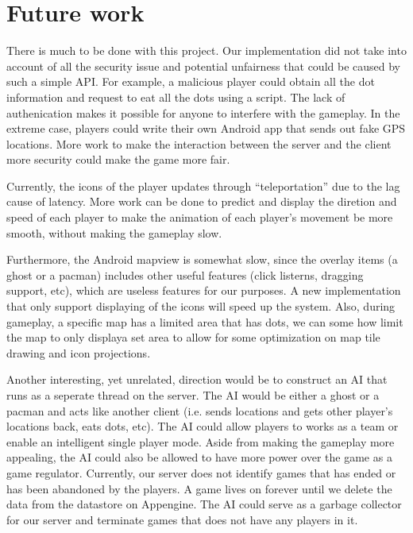 \documentclass{acm_proc_article-sp}
\begin{document}
\section{Future work}

There is much to be done with this project. Our implementation did not
take into account of all the security issue and potential unfairness
that could be caused by such a simple API. For example, a malicious
player could obtain all the dot information and request to eat all the
dots using a script. The lack of authenication makes it possible for
anyone to interfere with the gameplay. In the extreme case, players
could write their own Android app that sends out fake GPS
locations. More work to make the interaction between the server and
the client more security could make the game more fair.

Currently, the icons of the player updates through ``teleportation''
due to the lag cause of latency. More work can be done to predict and
display the diretion and speed of each player to make the animation of
each player's movement be more smooth, without making the gameplay
slow.

Furthermore, the Android mapview is somewhat slow, since the overlay
items (a ghost or a pacman) includes other useful features (click
listerns, dragging support, etc), which are useless features for our
purposes. A new implementation that only support displaying of the
icons will speed up the system. Also, during gameplay, a specific map
has a limited area that has dots, we can some how limit the map to
only displaya set area to allow for some optimization on map tile
drawing and icon projections.

Another interesting, yet unrelated, direction would be to construct an
AI that runs as a seperate thread on the server. The AI would be
either a ghost or a pacman and acts like another client (i.e. sends
locations and gets other player's locations back, eats dots, etc). The
AI could allow players to works as a team or enable an intelligent
single player mode. Aside from making the gameplay more appealing, the
AI could also be allowed to have more power over the game as a game
regulator. Currently, our server does not identify games that has
ended or has been abandoned by the players. A game lives on forever
until we delete the data from the datastore on Appengine. The AI could
serve as a garbage collector for our server and terminate games that
does not have any players in it.




\end{document}
